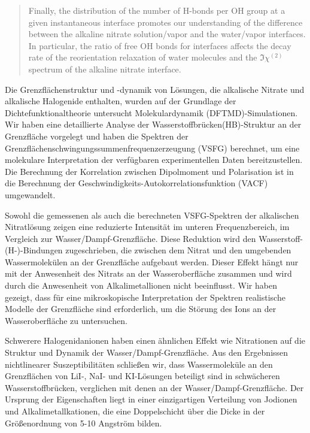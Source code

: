 \documentclass[
11pt, %
ngerman,
english, %
singlespacing, %
headsepline, %
]{MastersDoctoralThesis} %
\begin{document}
\begin{abstract}
Finally, the distribution of the number of H-bonds per OH group at a given instantaneous interface promotes our understanding of the difference between the alkaline nitrate
solution/vapor and the water/vapor interfaces. In particular, the ratio of free OH bonds for interfaces affects the decay rate of the reorientation relaxation of water
molecules and the $\Im \chi^{(2)}$ spectrum of the alkaline nitrate interface.
\end{abstract}

{
\begin{extraAbstract}
\addchaptertocentry{\abstractname} %
Die Grenzflächenstruktur und -dynamik von Lösungen, die alkalische Nitrate und alkalische Halogenide enthalten, wurden auf der Grundlage der Dichtefunktionaltheorie untersucht
Molekulardynamik (DFTMD)-Simulationen. Wir haben eine detaillierte Analyse der Wasserstoffbrücken(HB)-Struktur an der Grenzfläche vorgelegt und
haben die Spektren der Grenzflächenschwingungssummenfrequenzerzeugung (VSFG) berechnet, um eine molekulare Interpretation der verfügbaren experimentellen Daten bereitzustellen.
Die Berechnung der Korrelation zwischen Dipolmoment und Polarisation ist
in die Berechnung der Geschwindigkeits-Autokorrelationsfunktion (VACF) umgewandelt.

Sowohl die gemessenen als auch die berechneten VSFG-Spektren der alkalischen Nitratlösung zeigen eine reduzierte Intensität im unteren Frequenzbereich,
im Vergleich zur Wasser/Dampf-Grenzfläche.
Diese Reduktion wird den Wasserstoff-(H-)-Bindungen zugeschrieben, die zwischen dem Nitrat und den umgebenden Wassermolekülen an der Grenzfläche aufgebaut werden.
Dieser Effekt hängt nur mit der Anwesenheit des Nitrats an der Wasseroberfläche zusammen und wird durch die Anwesenheit von Alkalimetallionen nicht beeinflusst.
Wir haben gezeigt, dass für eine mikroskopische Interpretation der Spektren
realistische Modelle der Grenzfläche sind erforderlich, um die Störung des Ions an der Wasseroberfläche zu untersuchen.

Schwerere Halogenidanionen haben einen ähnlichen Effekt wie Nitrationen auf die Struktur und Dynamik der Wasser/Dampf-Grenzfläche.
Aus den Ergebnissen nichtlinearer Suszeptibilitäten schließen wir, dass Wassermoleküle an den Grenzflächen von LiI-, NaI- und KI-Lösungen beteiligt sind
in schwächeren Wasserstoffbrücken, verglichen mit denen an der Wasser/Dampf-Grenzfläche.
Der Ursprung der Eigenschaften liegt in einer einzigartigen Verteilung von Jodionen und Alkalimetallkationen,
die eine Doppelschicht über die Dicke in der Größenordnung von 5-10 Angström bilden.


\end{extraAbstract}}
\end{document}
